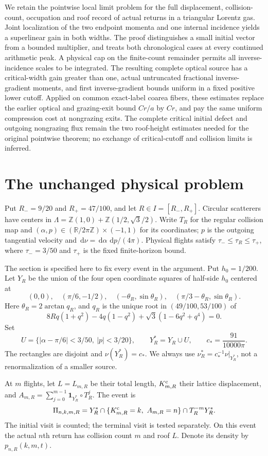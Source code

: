 \documentclass[11pt,reqno]{amsart}
\numberwithin{equation}{section}
\theoremstyle{definition}\newtheorem{definition}[theorem]{Definition}
\theoremstyle{remark}\newtheorem{remark}[theorem]{Remark}
\newcommand{\R}{\mathbb R}\newcommand{\Z}{\mathbb Z}\newcommand{\T}{\mathbb T}
\newcommand{\dd}{\,\mathrm d}\newcommand{\one}{\mathbf1}
\theoremstyle{definition}\newtheorem{inputstatement}[theorem]{Input statement}
\begin{document}
We retain the pointwise local limit problem for the full displacement,
collision-count, occupation and roof record of actual returns in a
triangular Lorentz gas. Joint localization of the two endpoint momenta
and one internal incidence yields a superlinear gain in both widths.
The proof distinguishes a small initial vector from a bounded
multiplier, and treats both chronological cases at every continued
arithmetic peak. A physical cap on the finite-count remainder permits
all inverse-incidence scales to be integrated. The resulting complete
optical source has a critical-width gain greater than one, actual
untruncated fractional inverse-gradient moments, and first
inverse-gradient bounds uniform in a fixed positive lower cutoff.
Applied on common exact-label coarea fibers, these estimates replace
the earlier optical and grazing-exit bound $Cr/a$ by $Cr$, and pay
the same uniform compression cost at nongrazing exits. The complete
critical initial defect and outgoing nongrazing flux remain the two
roof-height estimates needed for the original pointwise theorem;
no exchange of critical-cutoff and collision limits is inferred.



\section{The unchanged physical problem}
Put $R_-=9/20$ and $R_+=47/100$, and let $R\in I=[R_-,R_+]$. Circular scatterers have centers in
$\Lambda=\Z(1,0)+\Z(1/2,\sqrt3/2)$. Write $T_R$ for the regular
collision map and $(\alpha,p)\in(\R/2\pi\Z)\times(-1,1)$ for its
coordinates; $p$ is the outgoing tangential velocity and
$\dd\nu=\dd\alpha\,\dd p/(4\pi)$. Physical flights satisfy
$\tau_-\le\tau_R\le\tau_+$, where $\tau_-=3/50$ and $\tau_+$
is the fixed finite-horizon bound.

The section is specified here to fix every event in the argument.
Put $h_0=1/200$. Let $Y_R$ be the union of the four open coordinate
squares of half-side $h_0$ centered at
\[
 (0,0),\quad(\pi/6,-1/2),\quad
 (-\theta_R,\sin\theta_R),\quad
 (\pi/3-\theta_R,\sin\theta_R).
\]
Here $\theta_R=2\arctan q_R$, and $q_R$ is the unique root in
$(49/100,53/100)$ of
\[
 8Rq(1+q^2)-4q(1-q^2)+\sqrt3(1-6q^2+q^4)=0.
\]
Set
\[
 U=\{|\alpha-\pi/6|<3/50,\ |p|<3/20\},\qquad
 Y_R^*=Y_R\cup U,\qquad c_*=\frac{91}{10000\pi}.
\]
The rectangles are disjoint and $\nu(Y_R^*)=c_*$. We always use
$\nu_R^*=c_*^{-1}\nu|_{Y_R^*}$, not a renormalization of a smaller
source.

At $m$ flights, let $L=L_{m,R}$ be their total length,
$K^{\rm c}_{m,R}$ their lattice displacement, and
$A_{m,R}=\sum_{j=0}^{m-1}\one_{Y_R^*}\circ T_R^j$. The event is
\begin{equation}\label{eq:v76-event}
 \Pi_{n,k,m,R}=Y_R^*\cap\{K^{\rm c}_{m,R}=k,\ A_{m,R}=n\}
                         \cap T_R^{-m}Y_R^*.
\end{equation}
The initial visit is counted; the terminal visit is tested separately.
On this event the actual $n$th return has collision count $m$ and
roof $L$. Denote its density by $p_{n,R}(k,m,t)$.
\end{document}

